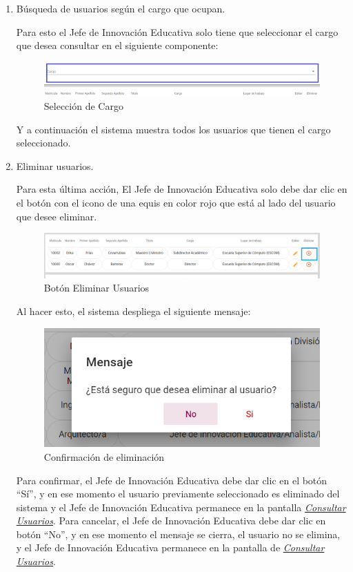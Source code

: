 \begin{enumerate}

	\item   Búsqueda de  usuarios según el cargo que ocupan.

	Para esto el Jefe de Innovación Educativa solo tiene que seleccionar el cargo que desea consultar en el siguiente componente:

	\begin{figure}[H]
		\centering
		\hypertarget{cargo1-JIE}{\includegraphics[width=0.7\linewidth]{images/SP5/BtnCargo1}}
		\caption{Selección de Cargo}
		\label{cargo1-JIE}
	\end{figure}

	Y a continuación el sistema muestra todos los usuarios que tienen el cargo seleccionado.

	   \newpage

	\item Eliminar usuarios.

	Para esta última acción, El Jefe de Innovación Educativa solo debe dar clic en el botón con el icono de una equis en color rojo que está al lado del usuario que desee eliminar.

	\begin{figure}[H]
		\centering
		\hypertarget{eliminar-JIE}{\includegraphics[width=0.7\linewidth]{images/SP5/BtnEliminar}}
		\caption{Botón Eliminar Usuarios}
		\label{eliminar-JIE}
	\end{figure}

	Al hacer esto, el sistema despliega el siguiente mensaje:

	\begin{figure}[H]
		\centering
		\includegraphics[width=0.4\linewidth]{images/SP5/MSG22}
		\caption{Confirmación de eliminación}
		\label{confirmarE-JIE}

	\end{figure}

	Para confirmar, el Jefe de Innovación Educativa debe dar clic en el botón “Sí”, y en ese momento el usuario previamente seleccionado es eliminado del sistema y el Jefe de Innovación Educativa permanece en la pantalla \hyperlink{consultarUs-JIE}{\textit{Consultar Usuarios}}.
	Para cancelar, el Jefe de Innovación Educativa debe dar clic en botón “No”, y en ese momento el mensaje se cierra, el usuario no se elimina, y el Jefe de Innovación Educativa permanece en la pantalla de \hyperlink{consultarUs-JIE}{\textit{Consultar Usuarios}}.

\end{enumerate}

